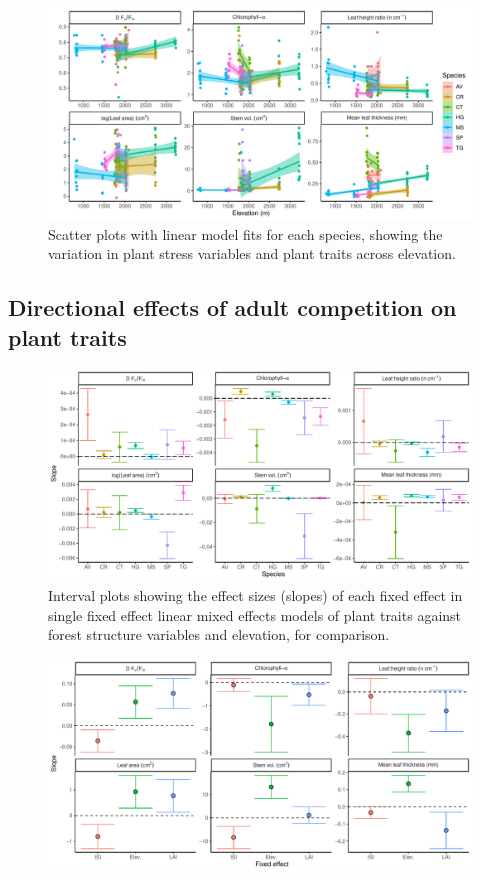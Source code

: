 \documentclass[a4paper, 11pt]{article}
\begin{document}
\begin{figure}[H]
\includegraphics[width=\textwidth]{traits_elev_scatter}
\centering
\caption{Scatter plots with linear model fits for each species, showing the variation in plant stress variables and plant traits across elevation.}
\label{traits_elev_scatter}
\end{figure}

\subsection{Directional effects of adult competition on plant traits}

\begin{figure}[H]
\includegraphics[width=\textwidth]{traits_elev_slopes}
\centering
\caption{Interval plots showing the effect sizes (slopes) of each fixed effect in single fixed effect linear mixed effects models of plant traits against forest structure variables and elevation, for comparison.}
\label{traits_elev_slopes}
\end{figure}

\begin{figure}[H]
\includegraphics[width=\textwidth]{single_pred_slope}
\centering
\caption{}
\label{single_pred_slope}
\end{figure}
\end{document}
